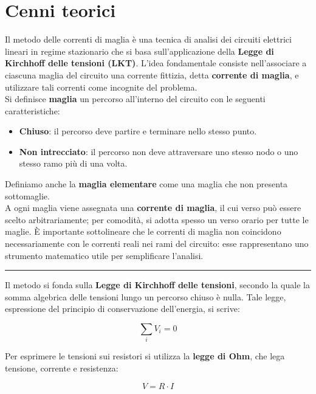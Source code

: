 \section{Cenni teorici}

Il metodo delle correnti di maglia è una tecnica di analisi dei circuiti elettrici lineari in regime stazionario che si basa sull'applicazione della \textbf{Legge di Kirchhoff delle tensioni (LKT)}.
L'idea fondamentale consiste nell'associare a ciascuna maglia del circuito una corrente fittizia, detta \textbf{corrente di maglia}, e utilizzare tali correnti come incognite del problema.\\

Si definisce \textbf{maglia} un percorso all'interno del circuito con le seguenti caratteristiche:
\begin{itemize}
    \item \textbf{Chiuso}: il percorso deve partire e terminare nello stesso punto.
    \item \textbf{Non intrecciato}: il percorso non deve attraversare uno stesso nodo o uno stesso ramo più di una volta.
\end{itemize}

Definiamo anche la \textbf{maglia elementare} come una maglia che non presenta sottomaglie.\\

A ogni maglia viene assegnata una \textbf{corrente di maglia}, il cui verso può essere scelto arbitrariamente; per comodità, si adotta spesso un verso orario per tutte le maglie. È importante sottolineare che le correnti di maglia non coincidono necessariamente con le correnti reali nei rami del circuito: esse rappresentano uno strumento matematico utile per semplificare l'analisi.\\
\hrule
\vspace{0.3cm}

Il metodo si fonda sulla \textbf{Legge di Kirchhoff delle tensioni}, secondo la quale la somma algebrica delle tensioni lungo un percorso chiuso è nulla. Tale legge, espressione del principio di conservazione dell'energia, si scrive:

\begin{equation}
    \sum_{i} V_i = 0
    \label{eq:LKT}
\end{equation}

Per esprimere le tensioni sui resistori si utilizza la \textbf{legge di Ohm}, che lega tensione, corrente e resistenza:

\begin{equation}
    V = R \cdot I
    \label{eq:ohm}
\end{equation}

